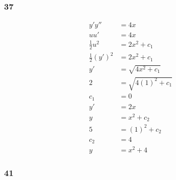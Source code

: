 \documentclass{article}
\begin{document}
\subsubsection{37}

\begin{align*}
  y' y''             & = 4 x                  \\
  u u'               & = 4 x                  \\
  \frac{1}{2} u^2    & = 2 x^2 + c_1          \\
  \frac{1}{2} (y')^2 & = 2 x^2 + c_1          \\
  y'                 & = \sqrt{4 x^2 + c_1}   \\
  2                  & = \sqrt{4 (1)^2 + c_1} \\
  c_1                & = 0                    \\
  y'                 & = 2 x                  \\
  y                  & = x^2 + c_2            \\
  5                  & = (1)^2 + c_2          \\
  c_2                & = 4                    \\
  y                  & = x^2 + 4
\end{align*}

\subsubsection{41}
\end{document}
